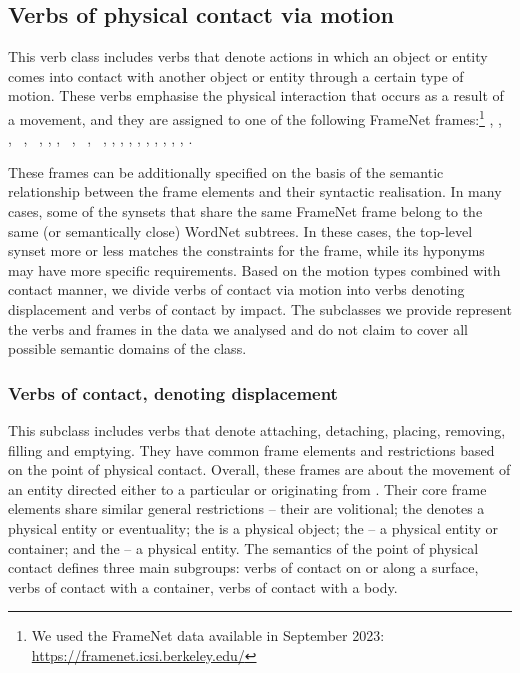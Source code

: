 \documentclass[output=paper,colorlinks,citecolor=brown]{langscibook}
\begin{document}
\subsection {Verbs of physical contact via motion}
This verb class includes verbs that denote actions in which an object or entity comes into contact with another object or entity through a certain type of motion. These verbs emphasise the physical interaction that occurs as a result of a movement, and they are assigned to one of the following FrameNet frames:\footnote{We used the FrameNet data available in September 2023: \url{https://framenet.icsi.berkeley.edu/}}
, ,~ ,~ ,~ , , ,~ ,~ ,~ , , , , , , , , , , .

These frames can be additionally specified on the basis of the semantic relationship between the frame elements and their syntactic realisation. In many cases, some of the synsets that share the same FrameNet frame belong to the same (or semantically close) WordNet subtrees. In these cases, the top-level synset more or less matches the constraints for the frame, while its hyponyms may have more specific requirements.
Based on the motion types combined with contact manner, we divide verbs of contact via motion into verbs denoting displacement and verbs of contact by impact. The subclasses we provide represent the verbs and frames in the data we analysed and do not claim to cover all possible semantic domains of the class.

\subsubsection {Verbs of contact, denoting displacement} \label{4.3.1.} 

This subclass includes verbs that denote attaching, detaching, placing, removing, filling and emptying. They have common frame elements and restrictions based on the point of physical contact. Overall, these frames are about the movement of an entity  directed either to a particular  or originating from . Their core frame elements share similar general restrictions -- their  are volitional; the  denotes a physical entity or eventuality; the  is a physical object; the  -- a physical entity or container; and the  -- a physical entity. 
The semantics of the point of physical contact defines three main subgroups: verbs of contact on or along a surface, verbs of contact with a container, verbs of contact with a body.
\end{document}
